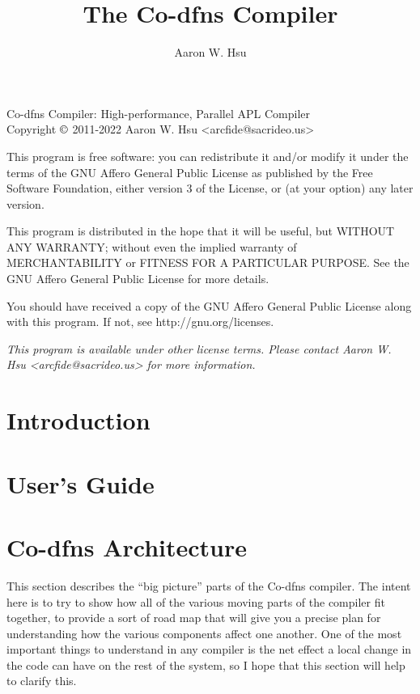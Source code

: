 \documentclass{article}%
\begin{document}
\nwdocspar
\title{The Co-dfns Compiler}
\author{Aaron W. Hsu}

\maketitle

\vfill

\noindent
Co-dfns Compiler: High-performance, Parallel APL Compiler\\
Copyright $\copyright$ 2011-2022 Aaron W. Hsu <arcfide@sacrideo.us>
\medskip

\noindent
This program is free software: you can redistribute it and/or
modify it under the terms of the GNU Affero General Public License as
published by the Free Software Foundation, either version 3 of the
License, or (at your option) any later version.
\medskip

\noindent
This program is distributed in the hope that it will be useful,
but WITHOUT ANY WARRANTY; without even the implied warranty of
MERCHANTABILITY or FITNESS FOR A PARTICULAR PURPOSE.    See the
GNU Affero General Public License for more details.\medskip

\noindent
You should have received a copy of the GNU Affero General Public License
along with this program.
If not, see http://gnu.org/licenses.
\medskip

\noindent
\emph{This program is available under other license terms. Please contact
Aaron W. Hsu <arcfide@sacrideo.us> for more information.}


\clearpage

\tableofcontents

\clearpage

\section{Introduction}

\section{User's Guide}

\section{Co-dfns Architecture}

This section describes the ``big picture'' parts of the Co-dfns compiler.
The intent here is to try to show how all of the various moving parts
of the compiler fit together,
to provide a sort of road map that will give you a precise plan
for understanding how the various components affect one another.
One of the most important things to understand in any compiler
is the net effect a local change in the code
can have on the rest of the system,
so I hope that this section will help to clarify this.
\end{document}
